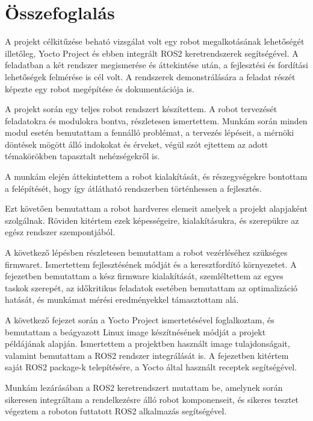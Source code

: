 \chapter{Összefoglalás}

A projekt célkitűzése beható vizsgálat volt egy robot megalkotásának lehetőségét
illetőleg, Yocto Project és ebben integrált ROS2 keretrendszerek segítségével. A
feladatban a két rendszer megismerése és áttekintése után, a fejlesztési és
fordítási lehetőségek felmérése is cél volt. A rendszerek demonstrálására a
feladat részét képezte egy robot megépítése és dokumentációja is.

\medskip

A projekt során egy teljes robot rendszert készítettem. A robot tervezését
feladatokra és modulokra bontva, részletesen ismertettem.  Munkám során minden
modul esetén bemutattam a fennálló problémat, a tervezés lépéseit, a mérnöki
döntések mögött álló indokokat és érveket, végül szót ejtettem az adott
témakörökben tapasztalt nehézségekről is.

A munkám elején áttekintettem a robot kialakítását, és részegységekre bontottam a
felépítését, hogy így átlátható rendszerben történhessen a fejlesztés.

Ezt követően bemutattam a robot hardveres elemeit amelyek a projekt alapjaként
szolgálnak. Röviden kitértem ezek képességeire, kialakításukra, és szerepükre az
egész rendszer szempontjából.

A következő lépésben részletesen bemutattam a robot vezérléséhez szükséges
firmwaret. Ismertettem fejlesztésének módját és a keresztfordító környezetet. A
fejezetben bemutattam a kész firmware kialakítását, szemléltettem az egyes taskok
szerepét, az időkritikus feladatok esetében bemutattam az optimalizáció hatását,
és munkámat mérési eredményekkel támasztottam alá. 

A következő fejezet során a Yocto Project ismertetésével foglalkoztam, és
bemutattam a beágyazott Linux image készítnésének módját a projekt példájának
alapján. Ismertettem a projektben használt image tulajdonságait, valamint
bemutattam a ROS2 rendszer integrálását is. A fejezetben kitértem saját ROS2
package-k telepítésére, a Yocto által használt receptek segítségével.

Munkám lezárásában a ROS2 keretrendszert mutattam be, amelynek során sikeresen
integráltam a rendelkezésre álló robot komponenseit, és sikeres tesztet végeztem
a roboton futtatott ROS2 alkalmazás segítségével.

